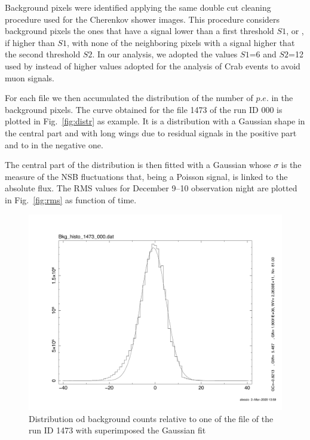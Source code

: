Background pixels were identified applying the same double cut cleaning procedure used for the Cherenkov shower images. This procedure considers background pixels the ones that have a signal lower than a first threshold $S1$, or , if higher than $S1$, with none of the neighboring pixels with a signal higher that the second threshold $S2$. In our analysis, we adopted the values $S1$=6 and $S2$=12 used by \cite{Mineo2019} instead of higher values adopted for the analysis of Crab events \citep{Lombardi2020} to avoid muon signals.

For each file we then accumulated the distribution of the number of $p.e.$ in the background pixels. The curve obtained for the file 1473 of the run ID 000 is plotted in Fig.~\ref{fig:distr} as example. It is a distribution with a Gaussian shape in the central part and with long wings due to residual signals in the positive part and to  in the negative one. 

The central part of the distribution is then fitted with a Gaussian whose $\sigma$ is the measure of the NSB fluctuations that, being a Poisson signal, is linked to the absolute flux. The RMS values for December 9--10 observation night are plotted in Fig.~\ref{fig:rms} as function of time.

\begin{figure}[ht!!]
\centering
\includegraphics[angle=0, width=12.5cm]{Figure/bkg_histo_1473_000.pdf}
\vspace{0.5cm}
\caption{Distribution od background counts relative to one of the file of the run ID 1473 with superimposed the Gaussian fit  }
\label{fig:FOC}
\end{figure}

